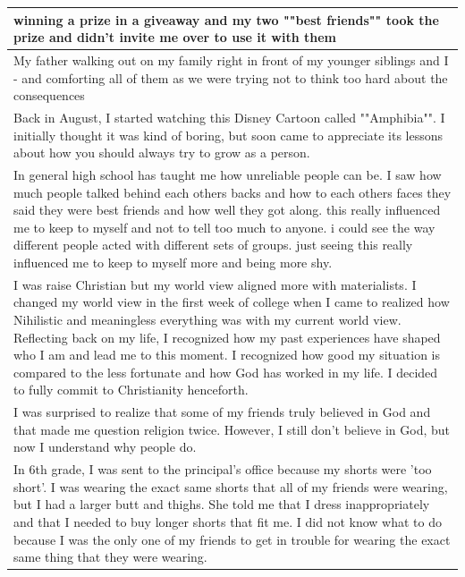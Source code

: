\documentclass[
  .7em,
  letterpaper,
  DIV=11,
  numbers=noendperiod]{scrartcl}
\begin{document}
\begin{table}
\begin{tabular}{l}
\hline
winning a prize in a giveaway and my two ""best friends"" took the prize and didn't invite me over to use it with them\\
\hline
My father walking out on my family right in front of my younger siblings and I - and comforting all of them as we were trying not to think too hard about the consequences\\
\hline
Back in August, I started watching this Disney Cartoon called ""Amphibia"". I initially thought it was kind of boring, but soon came to appreciate its lessons about how you should always try to grow as a person.\\
\hline
In general high school has taught me how unreliable people can be. I saw how much people talked behind each others backs and how to each others faces they said they were best friends and how well they got along. this really influenced me to keep to myself and not to tell too much to anyone. i could see the way different people acted with different sets of groups. just seeing this really influenced me to keep to myself more and being more shy.\\
\hline
I was raise Christian but my world view aligned more with materialists. I changed my world view in the first week of college when I came to realized how Nihilistic and meaningless everything was with my current world view. Reflecting back on my life, I recognized how my past experiences have shaped who I am and lead me to this moment. I recognized how good my situation is compared to the less fortunate and how God has worked in my life. I decided to fully commit to Christianity henceforth.\\
\hline
I was surprised to realize that some of my friends truly believed in God and that made me question religion twice. However, I still don't believe in God, but now I understand why people do.\\
\hline
In 6th grade, I was sent to the principal's office because my shorts were 'too short'. I was wearing the exact same shorts that all of my friends were wearing, but I had a larger butt and thighs. She told me that I dress inappropriately and that I needed to buy longer shorts that fit me. I did not know what to do because I was the only one of my friends to get in trouble for wearing the exact same thing that they were wearing.\\
\hline

\end{tabular}
\end{table}
\end{document}

